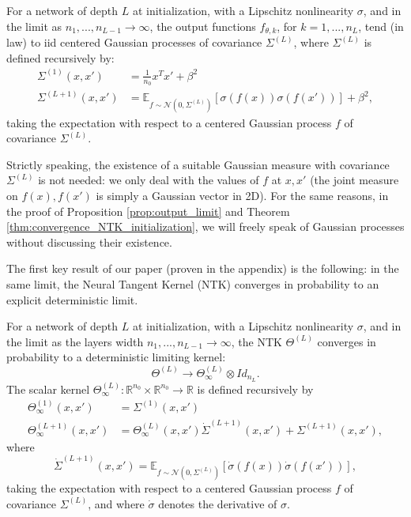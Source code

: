 \begin{prop}\label{prop:output_limit}
For a network of depth $L$ at initialization, with a Lipschitz nonlinearity $\sigma$, and in the limit as $n_1, ..., n_{L-1} \to \infty$, the output functions $f_{\theta, k}$, for $k=1, ..., n_L$, tend (in law) to iid centered Gaussian processes of covariance $\Sigma^{(L)}$, where $\Sigma^{(L)}$ is defined recursively by:
\begin{align*}
\Sigma^{(1)}(x, x') &= \frac{1}{n_0} x^T x' + \beta^2 \\
\Sigma^{(L+1)}(x, x') &= \mathbb{E}_{f\sim\mathcal{N}\left(0,\Sigma^{\left(L\right)}\right)}[\sigma(f(x)) \sigma(f(x'))] + \beta^2,
\end{align*}
taking the expectation with respect to a centered Gaussian process $f$ of covariance $\Sigma^{(L)}$.
\end{prop}

\begin{rem} \label{rem:no-problem-with-gauss-meas}
Strictly speaking, the existence of a suitable Gaussian measure with covariance $\Sigma^{(L)}$ is not needed: we only deal with the values of $f$ at $x, x'$ (the joint measure on $f(x), f(x')$ is simply a Gaussian vector in 2D). For the same reasons, in the proof of Proposition \ref{prop:output_limit} and Theorem \ref{thm:convergence_NTK_initialization}, we will freely speak of Gaussian processes without discussing their existence.
\end{rem}

The first key result of our paper (proven in the appendix) is the following: in the same limit, the Neural Tangent Kernel (NTK) converges in probability to an explicit deterministic limit.

\begin{thm}\label{thm:convergence_NTK_initialization}
For a network of depth $L$ at initialization, with a Lipschitz nonlinearity $\sigma$, and in the limit as the layers width $n_1, ..., n_{L-1} \to \infty$, the NTK $\Theta^{(L)}$ converges in probability to a deterministic limiting kernel: $$\Theta^{(L)} \to \Theta^{(L)}_\infty \otimes Id_{n_L}.$$ The scalar kernel $\Theta^{(L)}_\infty : \mathbb{R}^{n_0} \times \mathbb{R}^{n_0} \to \mathbb{R}$ is defined recursively by
\begin{align*}
    \Theta^{(1)}_\infty(x, x') &= \Sigma^{(1)}(x, x') \\
    \Theta^{(L+1)}_\infty(x, x') &=  \Theta^{(L)}_\infty(x, x') \dot{\Sigma}^{(L+1)}(x, x')  + \Sigma^{(L+1)}(x, x'),
\end{align*}
where
\[
	\dot{\Sigma}^{(L+1)}\left(x,x'\right)=
	\mathbb{E}_{f\sim\mathcal{N}\left(0,\Sigma^{\left(L\right)}\right)}\left[\dot{\sigma}\left(f\left(x\right)\right)\dot{\sigma}\left(f\left(x'\right)\right)\right],
\]
taking the expectation with respect to a centered Gaussian process $f$ of covariance $\Sigma^{(L)}$, and where $\dot{\sigma}$ denotes the derivative of $\sigma$.
\end{thm}

